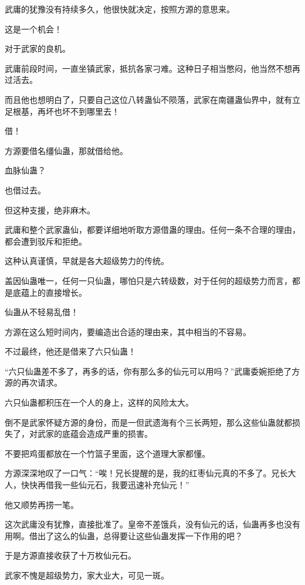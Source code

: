 
\begin{this_body}

武庸的犹豫没有持续多久，他很快就决定，按照方源的意思来。

这是一个机会！

对于武家的良机。

武庸前段时间，一直坐镇武家，抵抗各家刁难。这种日子相当憋闷，他当然不想再过活去。

而且他也想明白了，只要自己这位八转蛊仙不陨落，武家在南疆蛊仙界中，就有立足根基，再坏也坏不到哪里去！

借！

方源要借名缰仙蛊，那就借给他。

血脉仙蛊？

也借过去。

但这种支援，绝非麻木。

武庸和整个武家蛊仙，都要详细地听取方源借蛊的理由。任何一条不合理的理由，都会遭到驳斥和拒绝。

这种认真谨慎，早就是各大超级势力的传统。

盖因仙蛊唯一，任何一只仙蛊，哪怕只是六转级数，对于任何的超级势力而言，都是底蕴上的直接增长。

仙蛊从不轻易乱借！

方源在这么短时间内，要编造出合适的理由来，其中相当的不容易。

不过最终，他还是借来了六只仙蛊！

“六只仙蛊差不多了，再多的话，你有那么多的仙元可以用吗？”武庸委婉拒绝了方源的再次请求。

六只仙蛊都积压在一个人的身上，这样的风险太大。

倒不是武家怀疑方源的身份，而是一但武遗海有个三长两短，那么这些仙蛊就都损失了，对武家的底蕴会造成严重的损害。

不要把鸡蛋都放在一个竹篮子里面，这个道理大家都懂。

方源深深地叹了一口气：“唉！兄长提醒的是，我的红枣仙元真的不多了。兄长大人，快快再借我一些仙元石，我要迅速补充仙元！”

他又顺势再捞一笔。

这次武庸没有犹豫，直接批准了。皇帝不差饿兵，没有仙元的话，仙蛊再多也没有用啊。借出了这么的仙蛊，总得要让这些仙蛊发挥一下作用的吧？

于是方源直接收获了十万枚仙元石。

武家不愧是超级势力，家大业大，可见一斑。


\end{this_body}
